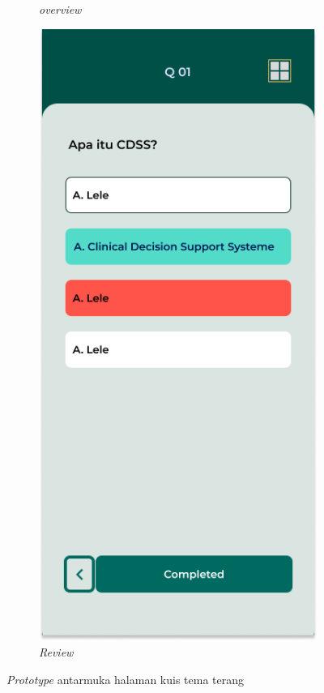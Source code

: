 \begin{figure}[H]
\begin{subfigure}[b]{0.23\textwidth}
	  \caption{\textit{overview}}
	  \label{fig:pilihNomor}
	\end{subfigure}
	\begin{subfigure}[b]{0.23\textwidth}
		\centering
	  \includegraphics[width=\linewidth]{contents/chapter-3/images/HF-kuis3.png}
	  \caption{\textit{Review}}
	  \label{fig:subjectScreen}
	\end{subfigure}
	\caption{\textit{Prototype} antarmuka halaman kuis tema terang}
	\label{Fig:HasilFeatureSetQuiz}
\end{figure}
